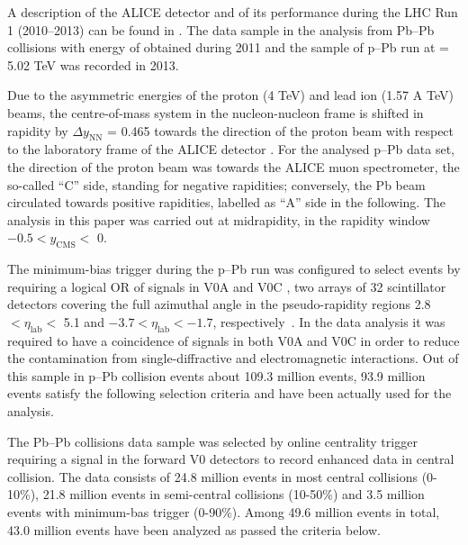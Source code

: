A description of the ALICE detector and of its performance during the LHC Run 1 (2010--2013)
can be found in \cite{cite:ALICE, cite:ALICEPerformance}. The data sample in the analysis from Pb--Pb collisions with energy of  obtained during 2011 and the sample of p--Pb run at \snn = 5.02 TeV was recorded in 2013. 

Due to the asymmetric energies of the proton (4 TeV) and lead ion (1.57 A TeV) beams, the centre-of-mass system in the nucleon-nucleon frame is shifted in rapidity by $\Delta y_{\mathrm{NN}}$ = 0.465 towards the 
direction of the proton beam with respect to the laboratory frame of the ALICE detector \cite{cite:KphipPb}. 
For the analysed p--Pb data set, the direction of the proton beam was towards the ALICE muon spectrometer,
the so-called ``C'' side, standing for negative rapidities; conversely, the Pb beam circulated towards 
positive rapidities, labelled as ``A'' side in the following. The analysis in this paper was carried out at midrapidity, 
in the rapidity window $-0.5 < y_{\mathrm{CMS}} <$ 0.

The minimum-bias trigger during the p--Pb run was configured to select events by requiring a logical OR 
of signals in V0A and V0C \cite{cite:ALICEPerformance}, two arrays of 32 scintillator detectors 
covering the full azimuthal angle in the pseudo-rapidity regions 2.8 $< \eta_{\mathrm{lab}} <$ 5.1 and 
$-3.7 < \eta_{\mathrm{lab}} < -1.7$, respectively~\cite{cite:rapidity}. In the data analysis it was required to 
have a coincidence of signals in both V0A and V0C in order to reduce the contamination 
from single-diffractive and electromagnetic interactions. Out of this sample in p--Pb collision events about 109.3 million events, 93.9 million events satisfy the following selection criteria and have been actually used for the analysis.  %

The Pb--Pb collisions data sample was selected by online centrality trigger requiring a signal in the forward V0 detectors\cite{cite:centralityPbPb}  to record enhanced data in central collision. The data consists of 24.8 million events in most central collisions (0-10\%), 21.8 million events in semi-central collisions (10-50\%) and 3.5 million events with minimum-bas trigger (0-90\%). Among 49.6 million events in total, 43.0 million events have been analyzed as passed the criteria below. 



